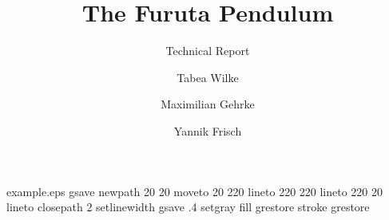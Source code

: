 %
%
%
%
%
\begin{filecontents*}{example.eps}
gsave
newpath
  20 20 moveto
  20 220 lineto
  220 220 lineto
  220 20 lineto
closepath
2 setlinewidth
gsave
  .4 setgray fill
grestore
stroke
grestore
\end{filecontents*}
%
\RequirePackage{fix-cm}
%
\documentclass[smallextended]{svjour3}       %
%
\smartqed  %
%
\usepackage{graphicx}
\usepackage[numbers]{natbib} %

%
 \usepackage{mathptmx}      %
%
\usepackage{amsmath}

%
%
%


\title{The Furuta Pendulum
}
\subtitle{Technical Report}


\author{Tabea Wilke \and Maximilian Gehrke \and Yannik Frisch %
}


